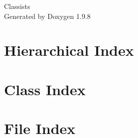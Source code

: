 \documentclass[twoside]{book}
\newcommand{\+}{\discretionary{\mbox{\scriptsize$\hookleftarrow$}}{}{}}
\newcommand{\clearemptydoublepage}{%
    \newpage{\pagestyle{empty}\cleardoublepage}%
  }
\begin{document}
  \raggedbottom
    \hypersetup{pageanchor=false,
                bookmarksnumbered=true,
                pdfencoding=unicode
               }
  \begin{titlepage}
  \vspace*{7cm}
  \begin{center}%
  {\Large Classists}\\
  \vspace*{1cm}
  {\large Generated by Doxygen 1.9.8}\\
  \end{center}
  \end{titlepage}
  \clearemptydoublepage
  \tableofcontents
  \clearemptydoublepage
  \hypersetup{pageanchor=true}

\chapter{Hierarchical Index}

\chapter{Class Index}

\chapter{File Index}

\end{document}
